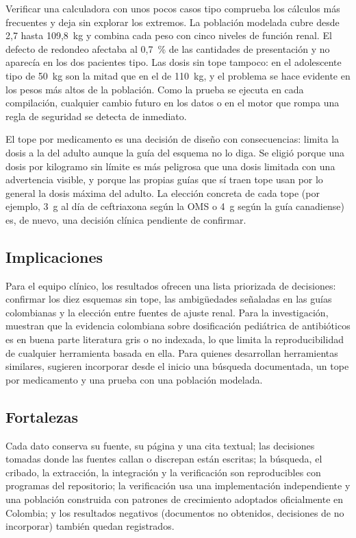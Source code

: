 \documentclass[11pt,a4paper]{article}
\begin{document}
Verificar una calculadora con unos pocos casos tipo comprueba los cálculos más frecuentes y deja sin explorar los extremos. La población modelada cubre desde 2,7 hasta 109,8~kg y combina cada peso con cinco niveles de función renal. El defecto de redondeo afectaba al 0,7~\% de las cantidades de presentación y no aparecía en los dos pacientes tipo. Las dosis sin tope tampoco: en el adolescente tipo de 50~kg son la mitad que en el de 110~kg, y el problema se hace evidente en los pesos más altos de la población. Como la prueba se ejecuta en cada compilación, cualquier cambio futuro en los datos o en el motor que rompa una regla de seguridad se detecta de inmediato.

El tope por medicamento es una decisión de diseño con consecuencias: limita la dosis a la del adulto aunque la guía del esquema no lo diga. Se eligió porque una dosis por kilogramo sin límite es más peligrosa que una dosis limitada con una advertencia visible, y porque las propias guías que sí traen tope usan por lo general la dosis máxima del adulto. La elección concreta de cada tope (por ejemplo, 3~g al día de ceftriaxona según la OMS o 4~g según la guía canadiense) es, de nuevo, una decisión clínica pendiente de confirmar.

\subsection{Implicaciones}

Para el equipo clínico, los resultados ofrecen una lista priorizada de decisiones: confirmar los diez esquemas sin tope, las ambigüedades señaladas en las guías colombianas y la elección entre fuentes de ajuste renal. Para la investigación, muestran que la evidencia colombiana sobre dosificación pediátrica de antibióticos es en buena parte literatura gris o no indexada, lo que limita la reproducibilidad de cualquier herramienta basada en ella. Para quienes desarrollan herramientas similares, sugieren incorporar desde el inicio una búsqueda documentada, un tope por medicamento y una prueba con una población modelada.

\subsection{Fortalezas}

Cada dato conserva su fuente, su página y una cita textual; las decisiones tomadas donde las fuentes callan o discrepan están escritas; la búsqueda, el cribado, la extracción, la integración y la verificación son reproducibles con programas del repositorio; la verificación usa una implementación independiente y una población construida con patrones de crecimiento adoptados oficialmente en Colombia; y los resultados negativos (documentos no obtenidos, decisiones de no incorporar) también quedan registrados.
\end{document}

